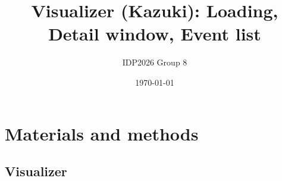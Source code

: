 \documentclass[11pt,a4paper]{article}
\title{Visualizer (Kazuki): Loading, Detail window, Event list}
\author{IDP2026 Group 8}
\date{\today}
\begin{document}
\maketitle

\section{Materials and methods}
\subsection{Visualizer}










\end{document}
